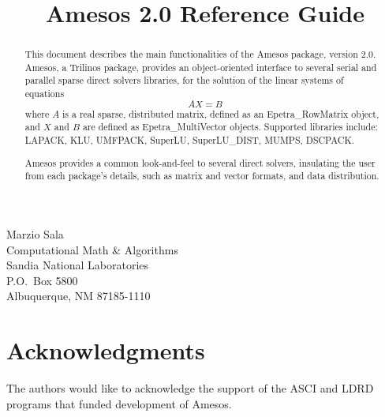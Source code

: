 \documentclass[11pt]{SANDreport}
\title{Amesos 2.0 Reference Guide}
\begin{document}
\maketitle

\begin{center}
Marzio  Sala \\
Computational Math \& Algorithms \\
Sandia National Laboratories\\
P.O.~Box 5800 \\
Albuquerque, NM 87185-1110
\end{center}

\vspace{20pt}

\begin{abstract}
  This document describes the main functionalities of the Amesos package,
  version 2.0. Amesos, a Trilinos package, provides an
  object-oriented interface to several serial and parallel sparse direct
  solvers libraries, for the solution of the linear systems of equations
  \begin{equation}
    \label{eq:linear_system}
    A X = B
  \end{equation}
  where $A$ is a real sparse, distributed matrix, defined as an
  Epetra\_RowMatrix object, and $X$ and $B$ are defined as
  Epetra\_MultiVector objects. Supported libraries include:
  LAPACK, KLU, UMFPACK, SuperLU, SuperLU\_DIST, MUMPS, DSCPACK.
  
  Amesos provides a common look-and-feel to several direct solvers,
  insulating the user from each package's details, such as matrix and
  vector formats, and data distribution.
\end{abstract}

\clearpage

\clearpage

\section*{Acknowledgments}
The authors would like to acknowledge the support of the ASCI and LDRD programs
that funded development of Amesos.

\clearpage

\SANDmain


\tableofcontents

\clearpage
\end{document}
